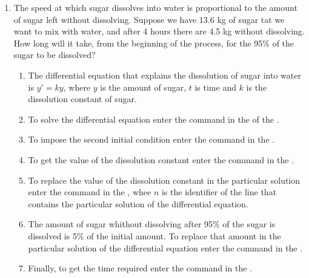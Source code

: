 \begin{enumerate}[leftmargin=*]
\item The speed at which sugar dissolves into water is proportional to the amount of sugar left without dissolving.
      Suppose we have $13.6$ kg of sugar tat we want to mix with water, and after 4 hours there are 4.5 kg without dissolving.
      How long will it take, from the beginning of the process, for the 95\% of the sugar to be dissolved?
      \begin{indication}
      \begin{enumerate}
      \item The differential equation that explains the dissolution of sugar into water is $y'=ky$, where $y$ is the amount of sugar, $t$ is time and $k$ is the dissolution constant of sugar.
      \item To solve the differential equation enter the command  in the  of the .
      \item To impose the second initial condition enter the command  in the .
      \item To get the value of the dissolution constant enter the command  in the .
      \item To replace the value of the dissolution constant in the particular solution enter the command   in the , whee $n$ is the identifier of the line that contains the particular solution of the differential equation.
      \item The amount of sugar whithout dissolving after 95\% of the sugar is dissolved  is 5\% of the initial amount.
            To replace that amount in the particular solution of the differential equation enter the command  in the .
      \item Finally, to get the time required enter the command  in the .
      \end{enumerate}
      \end{indication}

\end{enumerate}


